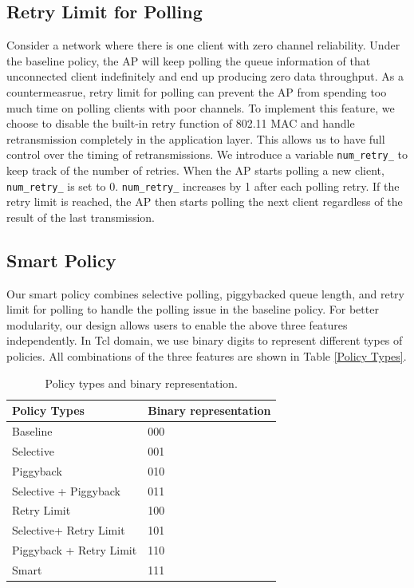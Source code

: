 \documentclass{article}
\begin{document}
\subsection{Retry Limit for Polling}

Consider a network where there is one client with zero channel reliability. Under the baseline policy, the AP will keep polling the queue information of that unconnected client indefinitely and end up producing zero data throughput. As a countermeasrue, retry limit for polling can prevent the AP from spending too much time on polling clients with poor channels. 
To implement this feature, we choose to disable the built-in retry function of 802.11 MAC and handle retransmission completely in the application layer. This allows us to have full control over the timing of retransmissions. We introduce a variable \lstinline|num_retry_| to keep track of the number of retries. When the AP starts polling a new client, \lstinline|num_retry_| is set to 0. \lstinline|num_retry_| increases by 1 after each polling retry. If the retry limit is reached, the AP then starts polling the next client regardless of the result of the last transmission. 

\subsection{Smart Policy}
Our smart policy combines selective polling, piggybacked queue length, and retry limit for polling to handle the polling issue in the baseline policy. For better modularity, our design allows users to enable the above three features independently. In Tcl domain, we use binary digits to represent different types of policies. All combinations of the three features are shown in Table \ref{Policy Types}. 

\begin{table}[htbp]
   \centering
   \caption{Policy types and binary representation.}
   \label{Policy Types}
   \begin{tabular}{| P{4cm} | P{3.5cm} |}
       \hline
       Policy Types   &  Binary representation\\   \hline
       Baseline &  000\\ \hline
       Selective & 001\\ \hline
       Piggyback & 010\\ \hline
       Selective + Piggyback & 011\\ \hline
       Retry Limit  &100\\ \hline
       Selective+ Retry Limit & 101\\ \hline
       Piggyback + Retry Limit & 110\\ \hline
       Smart &  111\\
       \hline
   \end{tabular}
\label{table: policy}
\end{table} 
\end{document}
